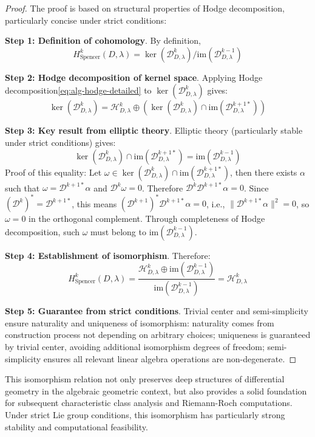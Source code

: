 \documentclass[a4paper,12pt]{extarticle}
\theoremstyle{definition}
\begin{document}
\begin{proof}
The proof is based on structural properties of Hodge decomposition, particularly concise under strict conditions:

\textbf{Step 1: Definition of cohomology}. By definition,
$$H^k_{\text{Spencer}}(D,\lambda) = \ker(\mathcal{D}^k_{D,\lambda}) / \mathrm{im}(\mathcal{D}^{k-1}_{D,\lambda})$$

\textbf{Step 2: Hodge decomposition of kernel space}. Applying Hodge decomposition\eqref{eq:alg-hodge-detailed} to $\ker(\mathcal{D}^k_{D,\lambda})$ gives:
$$\ker(\mathcal{D}^k_{D,\lambda}) = \mathcal{H}^k_{D,\lambda} \oplus (\ker(\mathcal{D}^k_{D,\lambda}) \cap \mathrm{im}(\mathcal{D}^{k+1*}_{D,\lambda}))$$

\textbf{Step 3: Key result from elliptic theory}. Elliptic theory (particularly stable under strict conditions) gives:
$$\ker(\mathcal{D}^k_{D,\lambda}) \cap \mathrm{im}(\mathcal{D}^{k+1*}_{D,\lambda}) = \mathrm{im}(\mathcal{D}^{k-1}_{D,\lambda})$$
Proof of this equality: Let $\omega \in \ker(\mathcal{D}^k_{D,\lambda}) \cap \mathrm{im}(\mathcal{D}^{k+1*}_{D,\lambda})$, then there exists $\alpha$ such that $\omega = \mathcal{D}^{k+1*}\alpha$ and $\mathcal{D}^k\omega = 0$. Therefore $\mathcal{D}^k\mathcal{D}^{k+1*}\alpha = 0$. Since $(\mathcal{D}^k)^* = \mathcal{D}^{k+1*}$, this means $(\mathcal{D}^{k+1})^*\mathcal{D}^{k+1*}\alpha = 0$, i.e., $\|\mathcal{D}^{k+1*}\alpha\|^2 = 0$, so $\omega = 0$ in the orthogonal complement. Through completeness of Hodge decomposition, such $\omega$ must belong to $\mathrm{im}(\mathcal{D}^{k-1}_{D,\lambda})$.

\textbf{Step 4: Establishment of isomorphism}. Therefore:
$$H^k_{\text{Spencer}}(D,\lambda) = \frac{\mathcal{H}^k_{D,\lambda} \oplus \mathrm{im}(\mathcal{D}^{k-1}_{D,\lambda})}{\mathrm{im}(\mathcal{D}^{k-1}_{D,\lambda})} = \mathcal{H}^k_{D,\lambda}$$

\textbf{Step 5: Guarantee from strict conditions}. Trivial center and semi-simplicity ensure naturality and uniqueness of isomorphism: naturality comes from construction process not depending on arbitrary choices; uniqueness is guaranteed by trivial center, avoiding additional isomorphism degrees of freedom; semi-simplicity ensures all relevant linear algebra operations are non-degenerate.
\end{proof}

This isomorphism relation not only preserves deep structures of differential geometry in the algebraic geometric context, but also provides a solid foundation for subsequent characteristic class analysis and Riemann-Roch computations. Under strict Lie group conditions, this isomorphism has particularly strong stability and computational feasibility.
\end{document}
